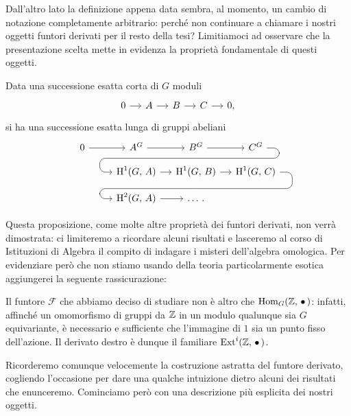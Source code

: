 Dall'altro lato la definizione appena data sembra, al momento, un cambio di notazione completamente arbitrario: perché non continuare a chiamare i nostri oggetti funtori derivati per il resto della tesi? Limitiamoci ad osservare che la presentazione scelta mette in evidenza la proprietà fondamentale di questi oggetti.

\begin{theorem}\label{fond} 
	Data una successione esatta corta di $ G $ moduli
	\[\begin{tikzcd}[column sep = small]
	0 \rar & A \rar & B \rar & C \rar & 0,
	\end{tikzcd}\]
	si ha una successione esatta lunga di gruppi abeliani
	\[\begin{tikzcd}[column sep = small, row sep = small]
	0 \rar & A^G \rar & B^G \arrow[d,phantom, ""{coordinate, name=Z}] \rar & C^G \arrow[dll, 
	rounded corners = 6 pt, 
	to path={ --([xshift=3ex]\tikztostart.east)
		|- (Z)[near end]\tikztonodes
		-| ([xshift=-3ex]\tikztotarget.west)
		-- (\tikztotarget)}] \\
	\qquad \quad &\HH^1(G, \, A) \rar & \HH^1(G, \, B) \arrow[d,phantom, ""{coordinate, name=W}] \rar & \HH^1(G, \, C) \arrow[dll, 
	rounded corners = 6 pt, 
	to path={ --([xshift=3ex]\tikztostart.east)
		|- (W)[near end]\tikztonodes
		-| ([xshift=-3ex]\tikztotarget.west)
		-- (\tikztotarget)}]  \\
	&\HH^2(G, \, A) \rar & \dots \, .
	& \end{tikzcd}\]
\end{theorem}

Questa proposizione, come molte altre proprietà dei funtori derivati, non verrà dimostrata: ci limiteremo a ricordare alcuni risultati e lasceremo al corso di Istituzioni di Algebra il compito di indagare i misteri dell'algebra omologica. Per evidenziare però che non stiamo usando della teoria particolarmente esotica aggiungerei la seguente rassicurazione:

\begin{remark}
	Il funtore $ \mathcal{F} $ che abbiamo deciso di studiare non è altro che $ \operatorname{Hom}_G(\mathbb{Z},\, \bullet\,) $: infatti, affinché un omomorfismo di gruppi da $ \mathbb{Z} $ in un modulo qualunque sia $ G $ equivariante, è necessario e sufficiente che l'immagine di $ 1 $ sia un punto fisso dell'azione. Il derivato destro è dunque il familiare $ \operatorname{Ext}^i(\mathbb{Z}, \, \bullet\,) $.
\end{remark}

Ricorderemo comunque velocemente la costruzione astratta del funtore derivato, cogliendo l'occasione per dare una qualche intuizione dietro alcuni dei risultati che enunceremo. Cominciamo però con una descrizione più esplicita dei nostri oggetti. 

